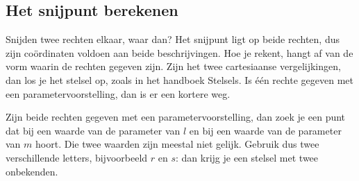\begin{oefeningen}
\end{oefeningen}

\subsection{Het snijpunt berekenen}

Snijden twee rechten elkaar, waar dan? Het snijpunt ligt op beide rechten, dus zijn coördinaten voldoen aan beide beschrijvingen. Hoe je rekent, hangt af van de vorm waarin de rechten gegeven zijn. Zijn het twee cartesiaanse vergelijkingen, dan los je het stelsel op, zoals in het handboek Stelsels. Is één rechte gegeven met een parametervoorstelling, dan is er een kortere weg.


Zijn beide rechten gegeven met een parametervoorstelling, dan zoek je een punt dat bij een waarde van de parameter van $l$ en bij een waarde van de parameter van $m$ hoort. Die twee waarden zijn meestal niet gelijk. Gebruik dus twee verschillende letters, bijvoorbeeld $r$ en $s$: dan krijg je een stelsel met twee onbekenden.

